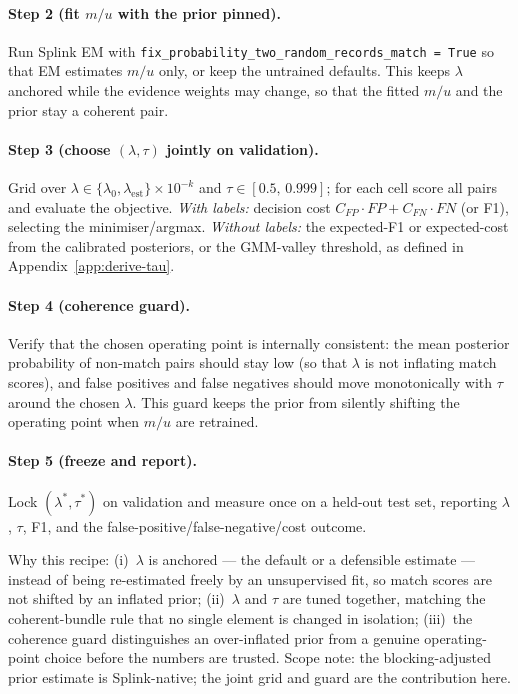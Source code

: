 \documentclass[11pt]{article}
\begin{document}
\paragraph{Step 2 (fit $m/u$ with the prior pinned).} Run Splink EM with \texttt{fix\_probability\_two\_random\_}\allowbreak\texttt{records\_match = True} so that EM estimates $m/u$ only, or keep the untrained defaults. This keeps $\lambda$ anchored while the evidence weights may change, so that the fitted $m/u$ and the prior stay a coherent pair.

\paragraph{Step 3 (choose $(\lambda,\tau)$ jointly on validation).} Grid over $\lambda\in\{\lambda_0,\lambda_\mathrm{est}\}\times 10^{-k}$ and $\tau\in[0.5,\,0.999]$; for each cell score all pairs and evaluate the objective. \emph{With labels:} decision cost $C_{FP}\cdot FP + C_{FN}\cdot FN$ (or F1), selecting the minimiser/argmax. \emph{Without labels:} the expected-F1 or expected-cost from the calibrated posteriors, or the GMM-valley threshold, as defined in Appendix~\ref{app:derive-tau}.

\paragraph{Step 4 (coherence guard).} Verify that the chosen operating point is internally consistent: the mean posterior probability of non-match pairs should stay low (so that $\lambda$ is not inflating match scores), and false positives and false negatives should move monotonically with $\tau$ around the chosen $\lambda$. This guard keeps the prior from silently shifting the operating point when $m/u$ are retrained.

\paragraph{Step 5 (freeze and report).} Lock $(\lambda^*,\tau^*)$ on validation and measure once on a held-out test set, reporting $\lambda$, $\tau$, F1, and the false-positive/false-negative/cost outcome.

Why this recipe: (i)~$\lambda$ is anchored --- the default or a defensible estimate --- instead of being re-estimated freely by an unsupervised fit, so match scores are not shifted by an inflated prior; (ii)~$\lambda$ and $\tau$ are tuned together, matching the coherent-bundle rule that no single element is changed in isolation; (iii)~the coherence guard distinguishes an over-inflated prior from a genuine operating-point choice before the numbers are trusted. Scope note: the blocking-adjusted prior estimate is Splink-native; the joint grid and guard are the contribution here.
\end{document}
